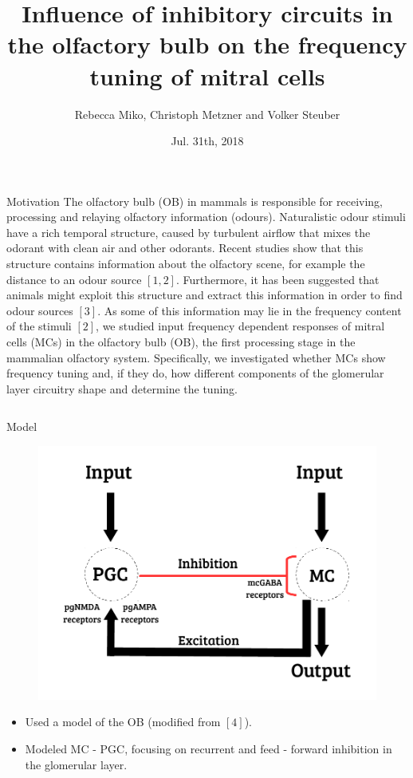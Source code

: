 \documentclass[final,hyperref={pdfpagelabels=false}]{beamer}
\title{Influence of inhibitory circuits in the olfactory bulb on the frequency tuning of mitral cells}
\author[Miko]{Rebecca Miko, Christoph Metzner and Volker Steuber}
\institute{University of Hertfordshire, AL10 9AB, UK}
\date{Jul. 31th, 2018}
\begin{document}
\begin{frame}{} 
\begin{block}{Motivation}
The olfactory bulb (OB) in mammals is responsible for receiving, processing and relaying olfactory information (odours). 
Naturalistic odour stimuli have a rich temporal structure, caused by turbulent airflow that mixes the odorant with clean air and other odorants. 
Recent studies show that this structure contains information about the olfactory scene, for example the distance to an odour source $[1,2]$. 
Furthermore, it has been suggested that animals might exploit this structure and extract this information in order to find odour sources $[3]$. 
As some of this information may lie in the frequency content of the stimuli $[2]$, we studied input frequency dependent responses of mitral cells (MCs) in the olfactory bulb (OB), the first processing stage in the mammalian olfactory system.
Specifically, we investigated whether MCs show frequency tuning and, if they do, how different components of the glomerular layer circuitry shape and determine the tuning.
\end{block}
    
    
\begin{columns}[t]
\begin{column}{.48\linewidth}
    
\begin{block}{Model} 
\begin{figure}
\center
\includegraphics[scale=0.6]{images/Circuit_Diagram}
\end{figure}
\begin{itemize}
\item Used a model of the OB (modified from $[4]$).
\item Modeled MC - PGC, focusing on recurrent and feed - forward inhibition in the glomerular layer.
\end{itemize}
\end{block}


\end{column}
\end{columns}
\end{frame}
\end{document}
